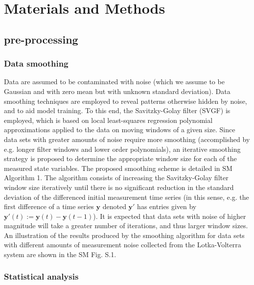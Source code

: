 \documentclass[12pt]{article}
\begin{document}
\section*{Materials and Methods}

\subsection*{\ours{} pre-processing}

\subsubsection*{Data smoothing}
Data are assumed to be contaminated with noise  (which we assume to be Gaussian and with zero mean but with unknown standard deviation). Data smoothing techniques are employed to reveal patterns otherwise hidden by noise, and to aid model training. To this end, the Savitzky-Golay filter (SVGF) \cite{savitzky1964smoothing} is employed, which is based on local least-squares regression polynomial approximations applied to the data on moving windows of a given size. Since data sets  with greater amounts of noise require more smoothing (accomplished by e.g. longer filter windows and lower order polynomials),  an iterative smoothing strategy is proposed to determine the appropriate window size for each of the measured state variables. The proposed smoothing scheme is detailed in SM Algorithm 1. The algorithm consists of increasing the Savitzky-Golay filter window size iteratively until there is no significant reduction in the standard deviation of the differenced initial measurement time series (in this sense, e.g. the first difference of a time series $\textbf{y}$ denoted $\textbf{y}'$  has entries given by  $\textbf{y}'(t) := \textbf{y}(t)-\textbf{y}(t-1)$). It is expected that data sets with noise of higher magnitude will take a greater number of iterations, and thus larger window sizes. An illustration of the results produced by the smoothing algorithm for data sets with different amounts of measurement noise collected from  the Lotka-Volterra system are shown in the SM Fig. S.1.


\subsubsection*{Statistical analysis}
\end{document}
